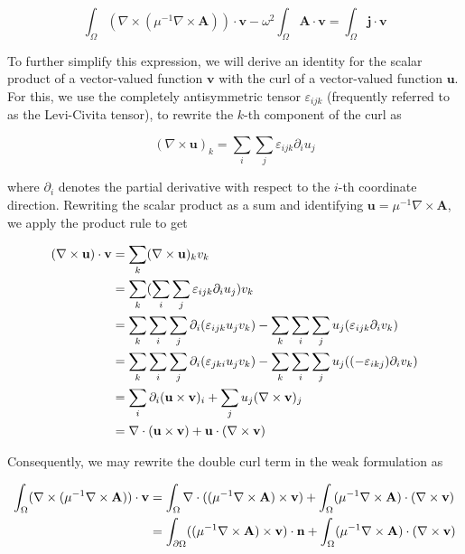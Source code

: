 \documentclass[11pt, a4paper]{article}
\begin{document}
\begin{equation}
    \int_{\Omega} (\nabla \times ({\mu^{-1} \nabla \times \mathbf{A}})) \cdot \mathbf{v}
    - \omega^2 \int_{\Omega} \mathbf{A} \cdot \mathbf{v} = \int_{\Omega} \mathbf{j} \cdot \mathbf{v} \label{equ:mwweak}
\end{equation}

To further simplify this expression, we will derive an identity for the scalar product
of a vector-valued function $\mathbf{v}$ with the curl of a vector-valued function 
$\mathbf{u}$. For this, we use the completely antisymmetric tensor $\varepsilon_{ijk}$
(frequently referred to as the Levi-Civita tensor), to rewrite the $k$-th component
of the curl as

\begin{equation}
    (\nabla \times \mathbf{u})_k = \sum_i \sum_j \varepsilon_{ijk} \partial_i u_j
\end{equation}

where $\partial_i$ denotes the partial derivative with respect to the $i$-th coordinate
direction. Rewriting the scalar product as a sum and identifying $\mathbf{u} = \mu^{-1}
\nabla \times \mathbf{A}$, we apply the product rule to get

\begin{align}
    (\nabla \times \mathbf{u}) \cdot \mathbf{v} &= \sum_k (\nabla \times \mathbf{u})_k v_k \notag \\ 
    &= \sum_k (\sum_i \sum_j \varepsilon_{ijk} \partial_i u_j) v_k \notag \\ 
    &= \sum_k \sum_i \sum_j \partial_i (\varepsilon_{ijk} u_j v_k) - \sum_k \sum_i \sum_j u_j (\varepsilon_{ijk} \partial_i v_k) \notag \\ 
    &= \sum_k \sum_i \sum_j \partial_i (\varepsilon_{jki} u_j v_k) - \sum_k \sum_i \sum_j u_j ((-\varepsilon_{ikj}) \partial_i v_k) \notag \\ 
    &= \sum_i \partial_i (\mathbf{u} \times \mathbf{v})_i + \sum_j u_j (\nabla \times \mathbf{v})_j \notag \\ 
    &= \nabla \cdot (\mathbf{u} \times \mathbf{v}) + \mathbf{u} \cdot (\nabla \times \mathbf{v}) \label{equ:curlidentity} 
\end{align}

Consequently, we may rewrite the double curl term in the weak formulation as 

\begin{align}
    \int_{\Omega} (\nabla \times ({\mu^{-1} \nabla \times \mathbf{A}})) \cdot \mathbf{v} &=
    \int_{\Omega} \nabla \cdot (({\mu^{-1} \nabla \times \mathbf{A}}) \times \mathbf{v})
    + \int_{\Omega} ({\mu^{-1} \nabla \times \mathbf{A}}) \cdot (\nabla \times \mathbf{v}) \notag \\
    &= \int_{\partial \Omega} (({\mu^{-1} \nabla \times \mathbf{A}}) \times \mathbf{v}) \cdot \mathbf{n}
    + \int_{\Omega} ({\mu^{-1} \nabla \times \mathbf{A}}) \cdot (\nabla \times \mathbf{v}) \notag \\
\end{align}
\end{document}
